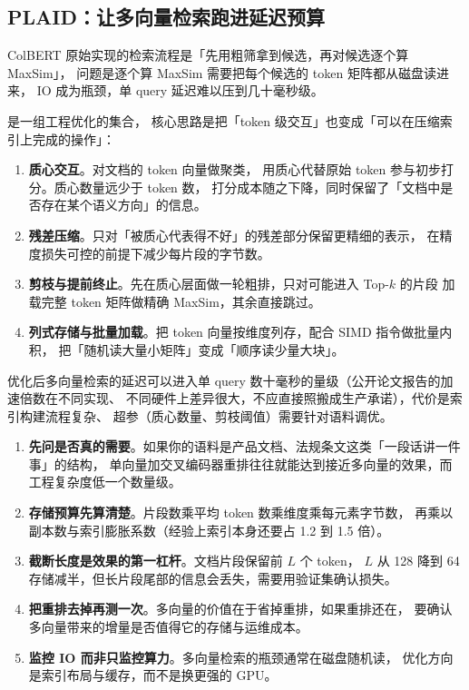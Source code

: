 \subsection{PLAID：让多向量检索跑进延迟预算}

ColBERT 原始实现的检索流程是「先用粗筛拿到候选，再对候选逐个算 MaxSim」，
问题是逐个算 MaxSim 需要把每个候选的 token 矩阵都从磁盘读进来，
IO 成为瓶颈，单 query 延迟难以压到几十毫秒级。

 是一组工程优化的集合，
核心思路是把「token 级交互」也变成「可以在压缩索引上完成的操作」：

\begin{enumerate}
  \item \textbf{质心交互}。对文档的 token 向量做聚类，
        用质心代替原始 token 参与初步打分。质心数量远少于 token 数，
        打分成本随之下降，同时保留了「文档中是否存在某个语义方向」的信息。
  \item \textbf{残差压缩}。只对「被质心代表得不好」的残差部分保留更精细的表示，
        在精度损失可控的前提下减少每片段的字节数。
  \item \textbf{剪枝与提前终止}。先在质心层面做一轮粗排，只对可能进入 Top-$k$ 的片段
        加载完整 token 矩阵做精确 MaxSim，其余直接跳过。
  \item \textbf{列式存储与批量加载}。把 token 向量按维度列存，配合 SIMD 指令做批量内积，
        把「随机读大量小矩阵」变成「顺序读少量大块」。
\end{enumerate}

优化后多向量检索的延迟可以进入单 query 数十毫秒的量级（公开论文报告的加速倍数在不同实现、
不同硬件上差异很大，不应直接照搬成生产承诺），代价是索引构建流程复杂、
超参（质心数量、剪枝阈值）需要针对语料调优。

\begin{toolbox}[多向量检索的落地检查清单]
\begin{enumerate}
  \item \textbf{先问是否真的需要}。如果你的语料是产品文档、法规条文这类「一段话讲一件事」的结构，
        单向量加交叉编码器重排往往就能达到接近多向量的效果，而工程复杂度低一个数量级。
  \item \textbf{存储预算先算清楚}。片段数乘平均 token 数乘维度乘每元素字节数，
        再乘以副本数与索引膨胀系数（经验上索引本身还要占 1.2 到 1.5 倍）。
  \item \textbf{截断长度是效果的第一杠杆}。文档片段保留前 $L$ 个 token，
        $L$ 从 128 降到 64 存储减半，但长片段尾部的信息会丢失，需要用验证集确认损失。
  \item \textbf{把重排去掉再测一次}。多向量的价值在于省掉重排，如果重排还在，
        要确认多向量带来的增量是否值得它的存储与运维成本。
  \item \textbf{监控 IO 而非只监控算力}。多向量检索的瓶颈通常在磁盘随机读，
        优化方向是索引布局与缓存，而不是换更强的 GPU。
\end{enumerate}
\end{toolbox}

